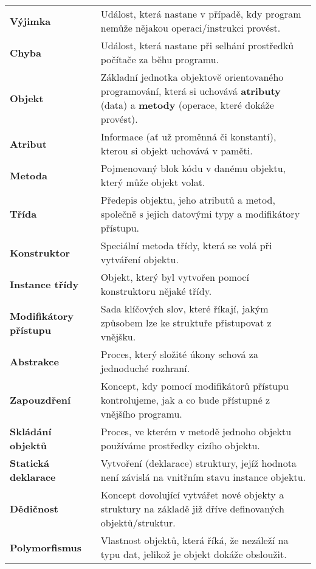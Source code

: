 \begin{longtable}[l]{@{}lp{12cm}@{}}
	\textbf{Výjimka} & Událost, která nastane v případě, kdy program nemůže nějakou operaci/instrukci provést. \\
	\textbf{Chyba} & Událost, která nastane při selhání prostředků počítače za běhu programu. \\
	\textbf{Objekt} & Základní jednotka objektově orientovaného programování, která si uchovává \textbf{atributy} (data) a \textbf{metody} (operace, které dokáže provést). \\
	\textbf{Atribut} & Informace (ať už proměnná či konstantí), kterou si objekt uchovává v paměti. \\
	\textbf{Metoda} & Pojmenovaný blok kódu v danému objektu, který může objekt volat. \\
	\textbf{Třída} & Předepis objektu, jeho atributů a metod, společně s jejich datovými typy a modifikátory přístupu. \\
	\textbf{Konstruktor} & Speciální metoda třídy, která se volá při vytváření objektu. \\
	\textbf{Instance třídy} & Objekt, který byl vytvořen pomocí konstruktoru nějaké třídy. \\
	\textbf{Modifikátory přístupu} & Sada klíčových slov, které říkají, jakým způsobem lze ke struktuře přistupovat z vnějšku. \\
	\textbf{Abstrakce} & Proces, který složité úkony schová za jednoduché rozhraní. \\
	\textbf{Zapouzdření} & Koncept, kdy pomocí modifikátorů přístupu kontrolujeme, jak a co bude přístupné z vnějšího programu. \\
	\textbf{Skládání objektů} & Proces, ve kterém v metodě jednoho objektu používáme prostředky cizího objektu. \\
	\textbf{Statická deklarace} & Vytvoření (deklarace) struktury, jejíž hodnota není závislá na vnitřním stavu instance objektu. \\ 
	\textbf{Dědičnost} & Koncept dovolující vytvářet nové objekty a struktury na základě již dříve definovaných objektů/struktur. \\
	\textbf{Polymorfismus} & Vlastnost objektů, která říká, že nezáleží na typu dat, jelikož je objekt dokáže obsloužit.
\end{longtable}
